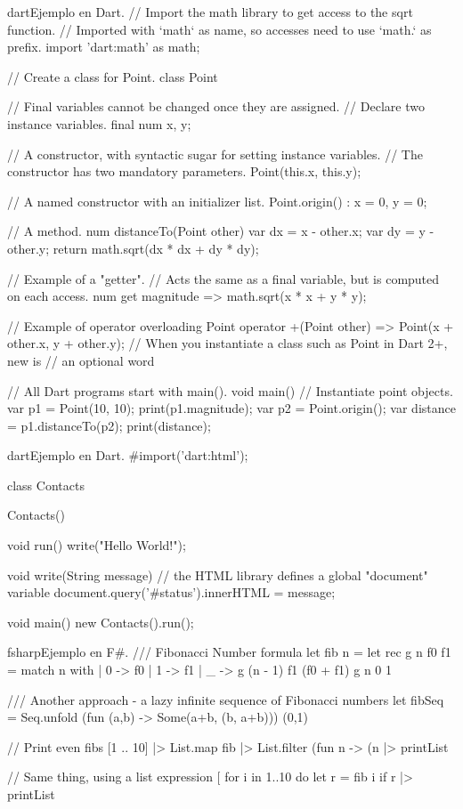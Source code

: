 \begin{sourcecode}{dart}{Ejemplo en Dart.}
// Import the math library to get access to the sqrt function.
// Imported with `math` as name, so accesses need to use `math.` as prefix.
import 'dart:math' as math;

// Create a class for Point.
class Point {

  // Final variables cannot be changed once they are assigned.
  // Declare two instance variables.
  final num x, y;

  // A constructor, with syntactic sugar for setting instance variables.
  // The constructor has two mandatory parameters.
  Point(this.x, this.y);

  // A named constructor with an initializer list.
  Point.origin()
      : x = 0,
        y = 0;

  // A method.
  num distanceTo(Point other) {
    var dx = x - other.x;
    var dy = y - other.y;
    return math.sqrt(dx * dx + dy * dy);
  }
  
  // Example of a "getter".
  // Acts the same as a final variable, but is computed on each access.
  num get magnitude => math.sqrt(x * x + y * y);

  // Example of operator overloading
  Point operator +(Point other) => Point(x + other.x, y + other.y);
  // When you instantiate a class such as Point in Dart 2+, new is 
  // an optional word
}

// All Dart programs start with main().
void main() {
  // Instantiate point objects.
  var p1 = Point(10, 10);
  print(p1.magnitude);
  var p2 = Point.origin();
  var distance = p1.distanceTo(p2);
  print(distance);
}
\end{sourcecode}

\begin{sourcecode}{dart}{Ejemplo en Dart.}
#import('dart:html');

class Contacts {

  Contacts() {
  }

  void run() {
    write("Hello World!");
  }

  void write(String message) {
    // the HTML library defines a global "document" variable
    document.query('#status').innerHTML = message;
  }
}

void main() {
  new Contacts().run();
}
\end{sourcecode}

\begin{sourcecode}{fsharp}{Ejemplo en F\#.}
/// Fibonacci Number formula
let fib n =
    let rec g n f0 f1 =
        match n with
        | 0 -> f0
        | 1 -> f1
        | _ -> g (n - 1) f1 (f0 + f1)
    g n 0 1

/// Another approach - a lazy infinite sequence of Fibonacci numbers
let fibSeq = Seq.unfold (fun (a,b) -> Some(a+b, (b, a+b))) (0,1)

// Print even fibs
[1 .. 10]
|> List.map     fib
|> List.filter  (fun n -> (n %
|> printList

// Same thing, using a list expression
[ for i in 1..10 do
    let r = fib i
    if r %
|> printList
\end{sourcecode}

